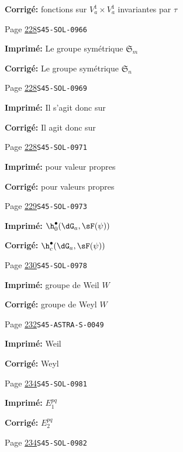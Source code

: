 \begin{description}
\par\noindent\textbf{Corrigé:} fonctions sur $V_a^1\times V_a^1$ invariantes par $\tau$
\smallskip
\item[\hypertarget{apparatus:FR-0239}{239}] Page \hyperlink{printpage:fr:228}{228}\quad\texttt{S45-SOL-0966}
\par\noindent\textbf{Imprimé:} Le groupe symétrique $\mathfrak{S}_m$
\par\noindent\textbf{Corrigé:} Le groupe symétrique $\mathfrak{S}_n$
\smallskip
\item[\hypertarget{apparatus:FR-0240}{240}] Page \hyperlink{printpage:fr:228}{228}\quad\texttt{S45-SOL-0969}
\par\noindent\textbf{Imprimé:} Il s'agit donc sur
\par\noindent\textbf{Corrigé:} Il agit donc sur
\smallskip
\item[\hypertarget{apparatus:FR-0241}{241}] Page \hyperlink{printpage:fr:228}{228}\quad\texttt{S45-SOL-0971}
\par\noindent\textbf{Imprimé:} pour valeur propres
\par\noindent\textbf{Corrigé:} pour valeurs propres
\smallskip
\item[\hypertarget{apparatus:FR-0242}{242}] Page \hyperlink{printpage:fr:229}{229}\quad\texttt{S45-SOL-0973}
\par\noindent\textbf{Imprimé:} \(\h_0^\bullet(\dG_a,\sF(\psi))\)
\par\noindent\textbf{Corrigé:} \(\h_c^\bullet(\dG_a,\sF(\psi))\)
\smallskip
\item[\hypertarget{apparatus:FR-0243}{243}] Page \hyperlink{printpage:fr:230}{230}\quad\texttt{S45-SOL-0978}
\par\noindent\textbf{Imprimé:} groupe de Weil $W$
\par\noindent\textbf{Corrigé:} groupe de Weyl $W$
\smallskip
\item[\hypertarget{apparatus:FR-0244}{244}] Page \hyperlink{printpage:fr:232}{232}\quad\texttt{S45-ASTRA-S-0049}
\par\noindent\textbf{Imprimé:} Weil
\par\noindent\textbf{Corrigé:} Weyl
\smallskip
\item[\hypertarget{apparatus:FR-0245}{245}] Page \hyperlink{printpage:fr:234}{234}\quad\texttt{S45-SOL-0981}
\par\noindent\textbf{Imprimé:} \(E_1^{p q}\)
\par\noindent\textbf{Corrigé:} \(E_2^{p q}\)
\smallskip
\item[\hypertarget{apparatus:FR-0246}{246}] Page \hyperlink{printpage:fr:234}{234}\quad\texttt{S45-SOL-0982}

\end{description}
